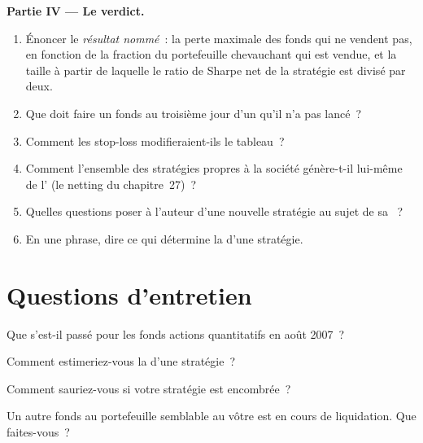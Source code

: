 \begin{problem}
\medskip\noindent\textbf{Partie IV --- Le verdict.}
\begin{enumerate}[resume]
\item Énoncer le \emph{résultat nommé}~: la perte maximale des fonds qui ne vendent pas, en fonction de la fraction du portefeuille chevauchant qui est vendue, et
la taille à partir de laquelle le ratio de Sharpe net de la stratégie est divisé par deux.
\item Que doit faire un fonds au troisième jour d'un  qu'il n'a pas lancé~?
\item Comment les stop-loss modifieraient-ils le tableau~?
\item Comment l'ensemble des stratégies propres à la société génère-t-il lui-même de l' (le netting du chapitre~27)~?
\item Quelles questions poser à l'auteur d'une nouvelle stratégie au sujet de sa ~?
\item En une phrase, dire ce qui détermine la  d'une stratégie.
\end{enumerate}
\end{problem}

\section{Questions d'entretien}

\begin{interviewq}\label{iq:rs:capacity-decay-and-crowding:1}
Que s'est-il passé pour les fonds actions quantitatifs en août 2007~?
\end{interviewq}

\begin{interviewq}\label{iq:rs:capacity-decay-and-crowding:2}
Comment estimeriez-vous la  d'une stratégie~?
\end{interviewq}

\begin{interviewq}\label{iq:rs:capacity-decay-and-crowding:3}
Comment sauriez-vous si votre stratégie est encombrée~?
\end{interviewq}

\begin{interviewq}\label{iq:rs:capacity-decay-and-crowding:4}
Un autre fonds au portefeuille semblable au vôtre est en cours de liquidation. Que faites-vous~?
\end{interviewq}

